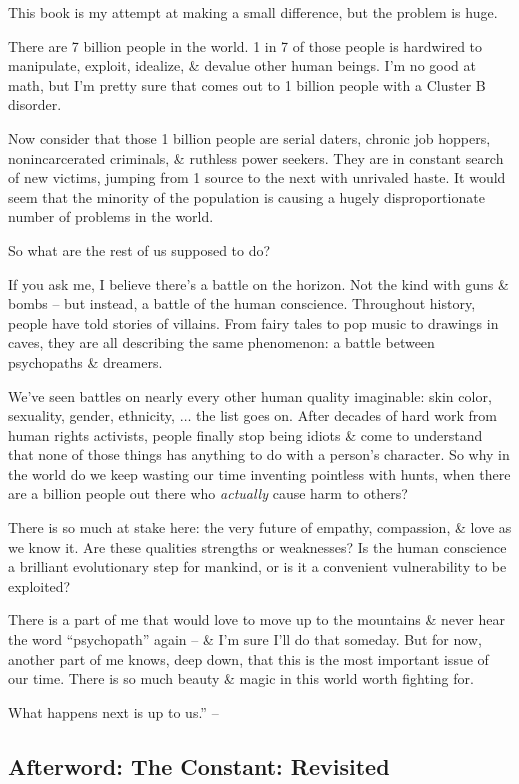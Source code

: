 \documentclass{article}
\numberwithin{equation}{section}
\begin{document}
This book is my attempt at making a small difference, but the problem is huge.

There are 7 billion people in the world. 1 in 7 of those people is hardwired to manipulate, exploit, idealize, \& devalue other human beings. I'm no good at math, but I'm pretty sure that comes out to 1 billion people with a Cluster B disorder.

Now consider that those 1 billion people are serial daters, chronic job hoppers, nonincarcerated criminals, \& ruthless power seekers. They are in constant search of new victims, jumping from 1 source to the next with unrivaled haste. It would seem that the minority of the population is causing a hugely disproportionate number of problems in the world.

So what are the rest of us supposed to do?

If you ask me, I believe there's a battle on the horizon. Not the kind with guns \& bombs -- but instead, a battle of the human conscience. Throughout history, people have told stories of villains. From fairy tales to pop music to drawings in caves, they are all describing the same phenomenon: a battle between psychopaths \& dreamers.

We've seen battles on nearly every other human quality imaginable: skin color, sexuality, gender, ethnicity, $\ldots$ the list goes on. After decades of hard work from human rights activists, people finally stop being idiots \& come to understand that none of those things has anything to do with a person's character. So why in the world do we keep wasting our time inventing pointless with hunts, when there are a billion people out there who \textit{actually} cause harm to others?

There is so much at stake here: the very future of empathy, compassion, \& love as we know it. Are these qualities strengths or weaknesses? Is the human conscience a brilliant evolutionary step for mankind, or is it a convenient vulnerability to be exploited?

There is a part of me that would love to move up to the mountains \& never hear the word ``psychopath'' again -- \& I'm sure I'll do that someday. But for now, another part of me knows, deep down, that this is the most important issue of our time. There is so much beauty \& magic in this world worth fighting for.

What happens next is up to us.'' -- \cite[pp. 199--201]{MacKenzie2015}

\subsection{Afterword: The Constant: Revisited}


\printbibliography[heading=bibintoc]
	
\end{document}

